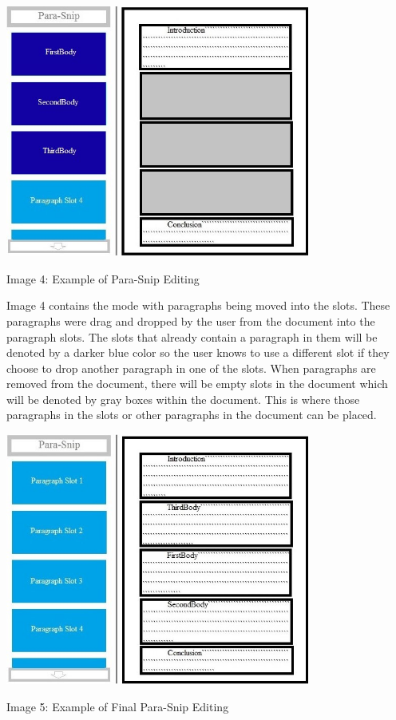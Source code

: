 \documentclass{article}
\begin{document}
\begin{center}
\includegraphics[width=100mm]{Essay3.jpg}
\end{center}
\begin{center}
Image 4: Example of Para-Snip Editing
\end{center}
\medskip

	Image 4 contains the mode with paragraphs being moved into the slots. These paragraphs were drag and dropped by the user from the document into the paragraph slots. The slots that already contain a paragraph in them will be denoted by a darker blue color so the user knows to use a different slot if they choose to drop another paragraph in one of the slots. When paragraphs are removed from the document, there will be empty slots in the document which will be denoted by gray boxes within the document. This is where those paragraphs in the slots or other paragraphs in the document can be placed. 

\begin{center}
\includegraphics[width=100mm]{Essay4.jpg}
\end{center}
\begin{center}
Image 5: Example of Final Para-Snip Editing
\end{center}
\medskip
\end{document}
